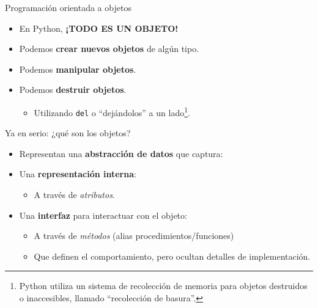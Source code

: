 \documentclass[mathserif]{beamer}
\begin{document}
\begin{frame}[fragile]{Programación orientada a objetos}
    \begin{itemize}
        \item En Python, {\blue\bfseries ¡TODO ES UN OBJETO!}
        
        \item Podemos {\orange\bfseries crear nuevos objetos} de algún tipo.
        
        \item Podemos {\orange\bfseries manipular objetos}.
        \item Podemos {\orange\bfseries destruir objetos}.
        \begin{itemize}
            \item Utilizando \lstinline|del| o ``dejándolos'' a un lado\footnote{Python utiliza un sistema de recolección de memoria para objetos destruidos o inaccesibles, llamado ``recolección de basura''.}.
        \end{itemize}
    \end{itemize}
\end{frame}

\begin{frame}[fragile]{Ya en serio: ¿qué son los objetos?}
    \begin{itemize}
        \item Representan una {\orange\bfseries abstracción de datos} que captura:
        
        \item Una {\blue\bfseries representación interna}:
        \begin{itemize}
            \item A través de \emph{atributos}.
        \end{itemize}
        
        \item Una {\blue\bfseries interfaz} para interactuar con el objeto:
        \begin{itemize}
            \item A través de \emph{métodos} ({\footnotesize alias procedimientos/funciones})
            \item Que definen el comportamiento, pero {\blue ocultan detalles de implementación}.
        \end{itemize}
    \end{itemize}
\end{frame}
\end{document}
